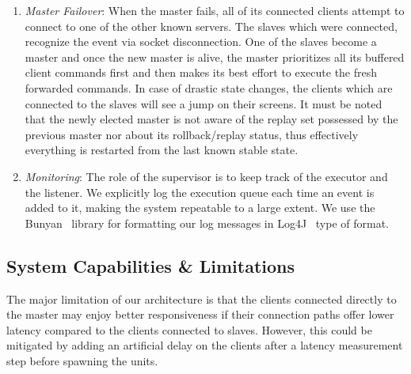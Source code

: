 \documentclass[a4paper]{IEEEtran}
\begin{document}
\begin{enumerate}
    \item \emph{Master Failover}: When the master fails, all of its connected clients attempt to connect to one of the other known servers. The slaves which were connected, recognize the event via socket disconnection. One of the slaves become a master and once the new master is alive, the master prioritizes all its buffered client commands first and then makes its best effort to execute the fresh forwarded commands. In case of drastic state changes, the clients which are connected to the slaves will see a jump on their screens. It must be noted that the newly elected master is not aware of the replay set possessed by the previous master nor about its rollback/replay status, thus effectively everything is restarted from the last known stable state.

    \item \emph{Monitoring}: The role of the supervisor is to keep track of the executor and the listener. We explicitly log the execution queue each time an event is added to it, making the system repeatable to a large extent. We use the Bunyan~\cite{bunyan} library for formatting our log messages in Log4J~\cite{log4j} type of format.
 
  \end{enumerate}
  
  \subsection{System Capabilities \& Limitations}
  
  The major limitation of our architecture is that the clients connected directly to the master may enjoy better responsiveness if their connection paths offer lower latency compared to the clients connected to slaves. However, this could be mitigated by adding an artificial delay on the clients after a latency measurement step before spawning the units.
  
\end{document}
